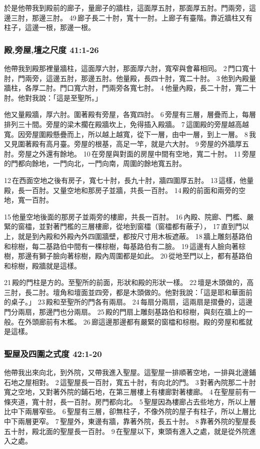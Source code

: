於是他帶我到殿前的廊子，量廊子的牆柱，這面厚五肘，那面厚五肘。門兩旁，這邊三肘，那邊三肘。 49 廊子長二十肘，寬十一肘。上廊子有臺階。靠近牆柱又有柱子，這邊一根，那邊一根。


\subsubsection{殿,旁屋,壇之尺度 41:1-26}
他帶我到殿那裡量牆柱，這面厚六肘，那面厚六肘，寬窄與會幕相同。 2 門口寬十肘，門兩旁，這邊五肘，那邊五肘。他量殿，長四十肘，寬二十肘。 3 他到內殿量牆柱，各厚二肘。門口寬六肘，門兩旁各寬七肘。 4 他量內殿，長二十肘，寬二十肘。他對我說：「這是至聖所。」

他又量殿牆，厚六肘。圍著殿有旁屋，各寬四肘。 6 旁屋有三層，層疊而上，每層排列三十間。旁屋的梁木擱在殿牆坎上，免得插入殿牆。 7 這圍殿的旁屋越高越寬。因旁屋圍殿懸疊而上，所以越上越寬，從下一層，由中一層，到上一層。 8 我又見圍著殿有高月臺。旁屋的根基，高足一竿，就是六大肘。 9 旁屋的外牆厚五肘。旁屋之外還有餘地。 10 在旁屋與對面的房屋中間有空地，寬二十肘。 11 旁屋的門都向餘地，一門向北，一門向南，周圍的餘地寬五肘。

12 在西面空地之後有房子，寬七十肘，長九十肘，牆四圍厚五肘。 13 這樣，他量殿，長一百肘。又量空地和那房子並牆，共長一百肘。 14 殿的前面和兩旁的空地，寬一百肘。

15 他量空地後面的那房子並兩旁的樓廊，共長一百肘。 16 內殿、院廊、門檻、嚴緊的窗櫺，並對著門檻的三層樓廊，從地到窗櫺（窗櫺都有蔽子）， 17 直到門以上，就是到內殿和外殿內外四圍牆壁，都按尺寸用木板遮蔽。 18 牆上雕刻基路伯和棕樹，每二基路伯中間有一棵棕樹，每基路伯有二臉。 19 這邊有人臉向著棕樹，那邊有獅子臉向著棕樹，殿內周圍都是如此。 20 從地至門以上，都有基路伯和棕樹，殿牆就是這樣。

21 殿的門柱是方的。至聖所的前面，形狀和殿的形狀一樣。 22 壇是木頭做的，高三肘，長二肘。壇角和壇面並四旁，都是木頭做的。他對我說：「這是耶和華面前的桌子。」 23 殿和至聖所的門各有兩扇。 24 每扇分兩扇，這兩扇是摺疊的，這邊門分兩扇，那邊門也分兩扇。 25 殿的門扇上雕刻基路伯和棕樹，與刻在牆上的一般。在外頭廊前有木檻。 26 廊這邊那邊都有嚴緊的窗櫺和棕樹。殿的旁屋和檻就是這樣。


\subsubsection{聖屋及四圍之式度 42:1-20}
他帶我出來向北，到外院，又帶我進入聖屋。這聖屋一排順著空地，一排與北邊鋪石地之屋相對。 2 這聖屋長一百肘，寬五十肘，有向北的門。 3 對著內院那二十肘寬之空地，又對著外院的鋪石地，在第三層樓上有樓廊對著樓廊。 4 在聖屋前有一條夾道，寬十肘，長一百肘。房門都向北。 5 聖屋因為樓廊占去些地方，所以上層比中下兩層窄些。 6 聖屋有三層，卻無柱子，不像外院的屋子有柱子，所以上層比中下兩層更窄。 7 聖屋外，東邊有牆，靠著外院，長五十肘。 8 靠著外院的聖屋長五十肘，殿北面的聖屋長一百肘。 9 在聖屋以下，東頭有進入之處，就是從外院進入之處。

